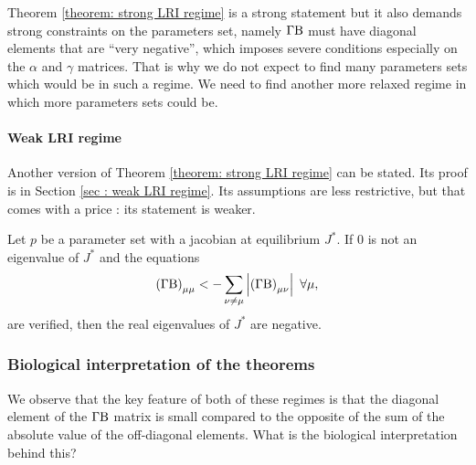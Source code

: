 \documentclass[12pt, titlepage]{report}
\begin{document}
\noindent Theorem \ref{theorem: strong LRI regime} is a strong statement but it also demands strong constraints on the parameters set, namely $\Gamma\text{B}$ must have diagonal elements that are ``very negative'', which imposes severe conditions especially on the $\alpha$ and $\gamma$ matrices. That is why we do not expect to find many parameters sets which would be in such a regime. We need to find another more relaxed regime in which more parameters sets could be.
\paragraph{Weak LRI regime}
Another version of Theorem \ref{theorem: strong LRI regime} can be stated. Its proof is in Section \ref{sec : weak LRI regime}. Its assumptions are less restrictive, but that comes with a price : its statement is weaker.
\begin{theorem}\label{theorem: weak LRI regime}
Let $p$ be a parameter set with a jacobian at equilibrium $J^*$. If $0$ is not an eigenvalue of $J^*$ and the equations
\begin{equation}
\left(\Gamma \text{B}\right)_{\mu\mu} < - \sum_{\nu \neq \mu } \left|{\left(\Gamma \text{B}\right)_{\mu \nu}}\right| \ \forall \mu,
\end{equation}
are verified, then the real eigenvalues of $J^*$ are negative.
\end{theorem}

\subsubsection{Biological interpretation of the theorems}
We observe that the key feature of both of these regimes is that the diagonal element of the $\Gamma\text{B}$ matrix is small compared to the opposite of the sum of the absolute value of the off-diagonal elements. What is the biological interpretation behind this?
\end{document}
